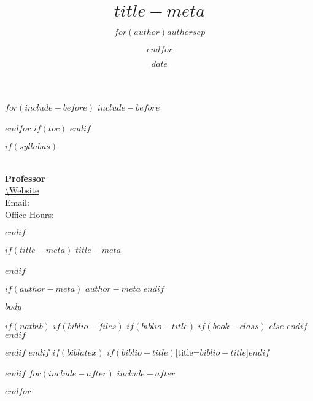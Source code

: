 \documentclass[$if(fontsize)$$fontsize$,$endif$$if(lang)$$lang$,$endif$]{$documentclass$}
\title{$title-meta$}
\author{$for(author)$$author$$sep$ \and $endfor$}
\date{$date$}
\begin{document}
$for(include-before)$
$include-before$

$endfor$
$if(toc)$
{
\hypersetup{linkcolor=black}
\tableofcontents
}
$endif$

$if(syllabus)$
%

\begin{flushleft}

\textbf{\CourseTitle{} \\
Professor \InstructorName} \\
\url{\Website} \\
Email: \Email \\
Office Hours: \OfficeHours
\end{flushleft}

$endif$

$if(title-meta)$
\textbf{$title-meta$} \\ \\
$endif$

$if(author-meta)$
\textit{$author-meta$}
$endif$


$body$

$if(natbib)$
$if(biblio-files)$
$if(biblio-title)$
$if(book-class)$
\renewcommand\bibname{$biblio-title$}
$else$
\renewcommand\refname{$biblio-title$}
$endif$
$endif$


$endif$
$endif$
$if(biblatex)$
\printbibliography$if(biblio-title)$[title=$biblio-title$]$endif$

$endif$
$for(include-after)$
$include-after$

$endfor$
\end{document}

